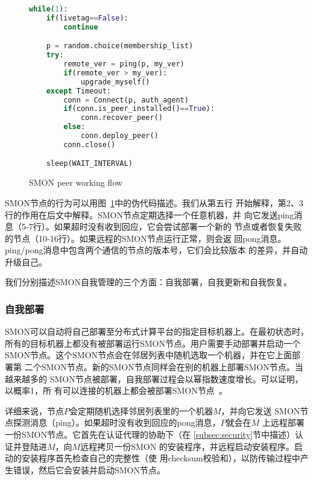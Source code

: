 \begin{figure}
\centering
\begin{lstlisting}[language=Python,morekeywords={True,False},frame=tb,basicstyle=\small,numbers=right,numbersep=-5pt,numberstyle=\tiny]
while(1):
    if(livetag==False):
        continue

    p = random.choice(membership_list)
    try:
        remote_ver = ping(p, my_ver)
        if(remote_ver > my_ver):
            upgrade_myself()
    except Timeout:
        conn = Connect(p, auth_agent)
        if(conn.is_peer_installed()==True):
            conn.recover_peer()
        else:
            conn.deploy_peer()
        conn.close()

    sleep(WAIT_INTERVAL)
\end{lstlisting}
\caption{SMON peer working flow}
\label{fig:peerflow}
\end{figure}

SMON节点的行为可以用图~\ref{fig:peerflow}中的伪代码描述。我们从第五行
开始解释，第2、3行的作用在后文中解释。SMON节点定期选择一个任意机器，并
向它发送ping消息（5-7行）。如果超时没有收到回应，它会尝试部署一个新的
节点或者恢复失败的节点（10-16行）。如果远程的SMON节点运行正常，则会返
回pong消息。ping/pong消息中包含两个通信的节点的版本号，它们会比较版本
的差异，并自动升级自己。

我们分别描述SMON自我管理的三个方面：自我部署，自我更新和自我恢复。

\subsubsection*{自我部署}


SMON可以自动将自己部署至分布式计算平台的指定目标机器上。在最初状态时，
所有的目标机器上都没有被部署运行SMON节点。用户需要手动部署并启动一个
SMON节点。这个SMON节点会在邻居列表中随机选取一个机器，并在它上面部署第
二个SMON节点。新的SMON节点同样会在别的机器上部署SMON节点。当越来越多的
SMON节点被部署，自我部署过程会以幂指数速度增长。可以证明，以概率1，所
有可以连接的机器上都会被部署SMON节点~\cite{Eugster2004}。

详细来说，节点$P$会定期随机选择邻居列表里的一个机器$M$，并向它发送
SMON节点探测消息（ping）。如果超时没有收到回应的pong消息，$P$就会在$M$
上远程部署一份SMON节点。它首先在认证代理的协助下（在
\ref{subsec:security}节中描述）认证并登陆进$M$，向$M$远程拷贝一份SMON
的安装程序，并远程启动安装程序。启动的安装程序首先检查自己的完整性（使
用checksum校验和），以防传输过程中产生错误，然后它会安装并启动SMON节点。

